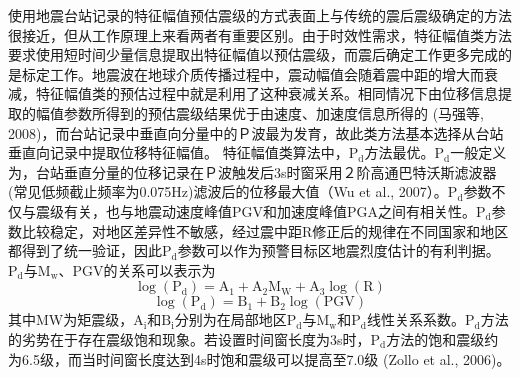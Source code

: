  \indent 使用地震台站记录的特征幅值预估震级的方式表面上与传统的震后震级确定的方法很接近，但从工作原理上来看两者有重要区别。由于时效性需求，特征幅值类方法要求使用短时间少量信息提取出特征幅值以预估震级，而震后确定工作更多完成的是标定工作。地震波在地球介质传播过程中，震动幅值会随着震中距的增大而衰减，特征幅值类的预估过程中就是利用了这种衰减关系。相同情况下由位移信息提取的幅值参数所得到的预估震级结果优于由速度、加速度信息所得的 (马强等, 2008)，而台站记录中垂直向分量中的Ｐ波最为发育，故此类方法基本选择从台站垂直向记录中提取位移特征幅值。
 \indent 特征幅值类算法中，$\mathrm{P}_{\mathrm{d}}$方法最优。$\mathrm{P}_{\mathrm{d}}$一般定义为，台站垂直分量的位移记录在Ｐ波触发后3s时窗采用２阶高通巴特沃斯滤波器(常见低频截止频率为0.075Hz)滤波后的位移最大值（Wu et al., 2007）。$\mathrm{P}_{\mathrm{d}}$参数不仅与震级有关，也与地震动速度峰值PGV和加速度峰值PGA之间有相关性。$\mathrm{P}_{\mathrm{d}}$参数比较稳定，对地区差异性不敏感，经过震中距R修正后的规律在不同国家和地区都得到了统一验证，因此$\mathrm{P}_{\mathrm{d}}$参数可以作为预警目标区地震烈度估计的有利判据。$\mathrm{P}_{\mathrm{d}}$与$\mathrm{M}_{\mathrm{w}}$、PGV的关系可以表示为\\
\begin{equation}
\log \left(\mathrm{P}_{\mathrm{d}}\right)=\mathrm{A}_{1}+\mathrm{A}_{2} \mathrm{M}_{\mathrm{W}}+\mathrm{A}_{3} \log (\mathrm{R})
\end{equation}
\begin{equation}
\log \left(\mathrm{P}_{\mathrm{d}}\right)=\mathrm{B}_{1}+\mathrm{B}_{2} \log (\mathrm{PGV})
\end{equation}
 其中MW为矩震级，$\mathrm{A}_{\mathrm{i}}$和$\mathrm{B}_{\mathrm{i}}$分别为在局部地区$\mathrm{P}_{\mathrm{d}}$与$\mathrm{M}_{\mathrm{w}}$和$\mathrm{P}_{\mathrm{d}}$线性关系系数。$\mathrm{P}_{\mathrm{d}}$方法的劣势在于存在震级饱和现象。若设置时间窗长度为3s时，$\mathrm{P}_{\mathrm{d}}$方法的饱和震级约为6.5级，而当时间窗长度达到4s时饱和震级可以提高至7.0级 (Zollo et al., 2006)。\\
 

 
 
